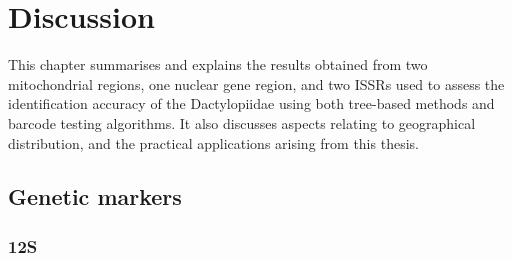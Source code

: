 \chapter{Discussion}

This chapter summarises and explains the results obtained from two mitochondrial regions, one nuclear gene region, and two ISSRs used to assess the identification accuracy of the Dactylopiidae using both tree-based methods and barcode testing algorithms. It also discusses aspects relating to geographical distribution, and the practical applications arising from this thesis.

\section{Genetic markers}
\subsection{12S}

